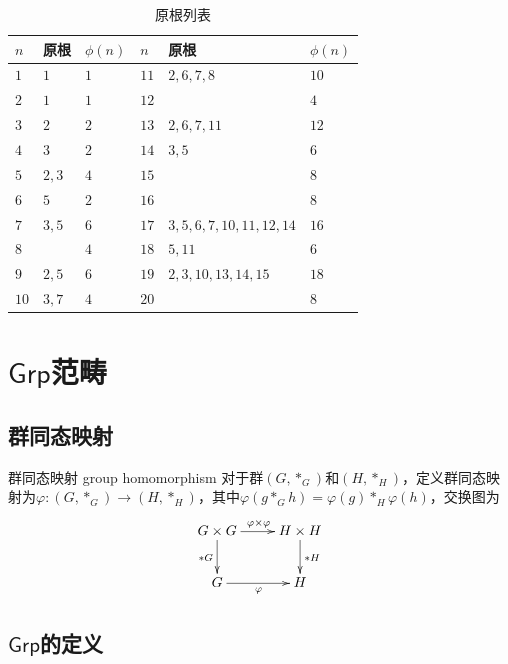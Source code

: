 \begin{table}[H]
	\centering
	\caption{原根列表}
	\begin{tabular}{|>{\centering\arraybackslash}m{1cm}|>{\centering\arraybackslash}m{4cm}|>{\centering\arraybackslash}m{1cm}|>{\centering\arraybackslash}m{1cm}|>{\centering\arraybackslash}m{4cm}|>{\centering\arraybackslash}m{1cm}|}
		\hline
		$n$ & \textbf{原根} & $\phi(n)$ & $n$ & \textbf{原根} & $\phi(n)$ \\
		\hline
		$1$ & $1$ & $1$ & $11$ & $2,6,7,8$ & $10$ \\
		\hline
		$2$ & $1$ & $1$ & $12$ & & $4$ \\
		\hline
		$3$ & $2$ & $2$ & $13$ & $2,6,7,11$ & $12$ \\
		\hline
		$4$ & $3$ & $2$ & $14$ & $3,5$ & $6$ \\
		\hline
		$5$ & $2,3$ & $4$ & $15$ & & $8$ \\
		\hline
		$6$ & $5$ & $2$ & $16$ & & $8$ \\
		\hline
		$7$ & $3,5$ & $6$ & $17$ & $3,5,6,7,10,11,12,14$ & $16$ \\
		\hline
		$8$ & & $4$ & $18$ & $5,11$ & $6$ \\
		\hline
		$9$ & $2,5$ & $6$ & $19$ & $2,3,10,13,14,15$ & $18$ \\
		\hline
		$10$ & $3,7$ & $4$ & $20$ & & $8$ \\
		\hline
		\end{tabular}
\end{table}

\section{$\mathsf{Grp}$范畴}

\subsection{群同态映射}

\begin{definition}{群同态映射 group homomorphism}
	对于群$(G,*_G)$和$(H,*_H)$，定义群同态映射为$\varphi:(G,*_G)\to (H,*_H)$，其中$\varphi(g*_G h)=\varphi(g)*_H\varphi(h)$，交换图为
	$$
	\xymatrix{
		G\times G \ar[r]^{\varphi\times\varphi} \ar[d]_{*G}& H\times H \ar[d]^{*H}\\
		G \ar[r]_{\varphi}& H
	}
	$$
\end{definition}

\subsection{$\mathsf{Grp}$的定义}

